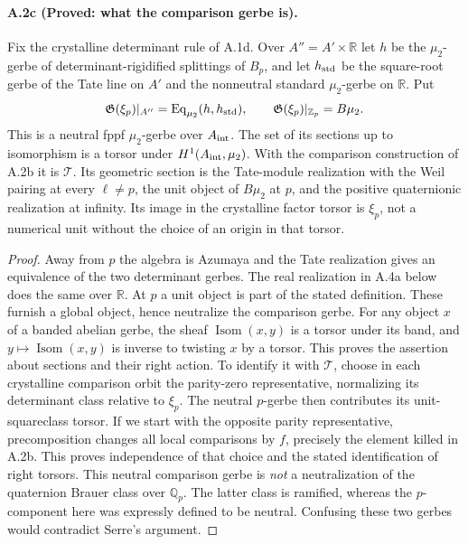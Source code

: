\paragraph{A.2c (Proved: what the comparison gerbe is).}
Fix the crystalline determinant rule of A.1d. Over $A''=A'\times\mathbb R$
let $h$ be the $\mu_2$-gerbe of determinant-rigidified splittings of
$B_p$, and let $h_{\rm std}$ be the square-root gerbe of the Tate line
on $A'$ and the nonneutral standard $\mu_2$-gerbe on $\mathbb R$.
Put
\[
 \mathfrak G(\xi_p)|_{A''}=\operatorname{Eq}_{\mu_2}(h,h_{\rm std}),
 \qquad
 \mathfrak G(\xi_p)|_{\mathbb Z_p}=B\mu_2.
\]
This is a neutral fppf $\mu_2$-gerbe over $A_{\rm int}$. The set of its
sections up to isomorphism is a torsor under $H^1(A_{\rm int},\mu_2)$.
With the comparison construction of A.2b it is $\mathcal T$.
Its geometric section is the Tate-module realization with the Weil
pairing at every $\ell\ne p$, the unit object of $B\mu_2$ at $p$,
and the positive quaternionic realization at infinity. Its image in
the crystalline factor torsor is $\xi_p$, not a numerical unit without
the choice of an origin in that torsor.

\begin{proof}
Away from $p$ the algebra is Azumaya and the Tate realization gives
an equivalence of the two determinant gerbes. The real realization in
A.4a below does the same over $\mathbb R$. At $p$ a unit object is
part of the stated definition. These furnish a global object, hence
neutralize the comparison gerbe. For any object $x$ of a banded abelian
gerbe, the sheaf $\operatorname{Isom}(x,y)$ is a torsor under its band,
and $y\mapsto\operatorname{Isom}(x,y)$ is inverse to twisting $x$ by
a torsor. This proves the assertion about sections and their right
action. To identify it with $\mathcal T$, choose in each crystalline
comparison orbit the parity-zero representative, normalizing its
determinant class relative to $\xi_p$. The neutral $p$-gerbe then
contributes its unit-squareclass torsor. If we start with the opposite
parity representative, precomposition changes all local comparisons
by $f$, precisely the element killed in A.2b. This proves independence
of that choice and the stated identification of right torsors.
This neutral comparison gerbe is \emph{not} a neutralization of the
quaternion Brauer class over $\mathbb Q_p$. The latter class is
ramified, whereas the $p$-component here was expressly defined to be
neutral. Confusing these two gerbes would contradict Serre's argument.
\end{proof}

